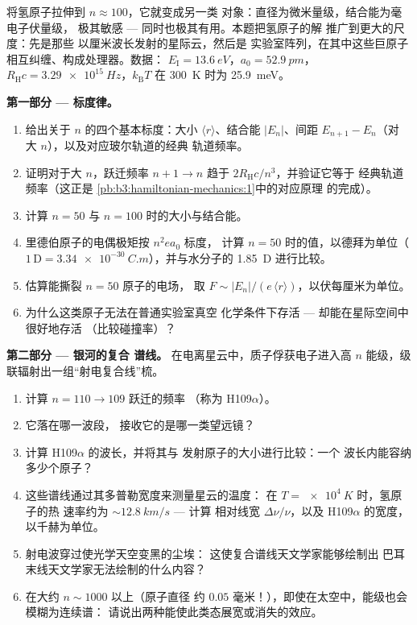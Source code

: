 \begin{problem}\label{pb:b3:hydrogen-atom:1}
将氢原子拉伸到 $n \approx 100$，它就变成另一类
对象：直径为微米量级，结合能为毫电子伏量级，
极其敏感 --- 同时也极其有用。本题把氢原子的解
推广到更大的尺度：先是那些
以厘米波长发射的星际云，然后是
实验室阵列，在其中这些巨原子相互纠缠、构成处理器。数据：
$E_{\text{I}} = \qty{13.6}{eV}$，$a_0 = \qty{52.9}{pm}$，
$R_{\text{H}}c = \qty{3.29e15}{Hz}$，$k_{\text{B}}T$ 在
\qty{300}{K} 时为 \qty{25.9}{meV}。

\medskip\noindent\textbf{第一部分 --- 标度律。}
\begin{enumerate}
  \item 给出关于 $n$ 的四个基本标度：大小 $\langle
        r\rangle$、结合能 $|E_n|$、间距 $E_{n+1} - E_n$（对
        大 $n$），以及对应玻尔轨道的经典
        轨道频率。
  \item 证明对于大 $n$，跃迁频率 $n+1 \to
        n$ 趋于 $2R_{\text{H}}c/n^3$，并验证它等于
        经典轨道频率（这正是
        \cref{pb:b3:hamiltonian-mechanics:1}中的对应原理
        的完成）。
  \item 计算 $n = 50$ 与 $n = 100$ 时的大小与结合能。
  \item 里德伯原子的电偶极矩按 $n^2ea_0$ 标度，
        计算 $n = 50$ 时的值，以德拜为单位（$1\,\text{D} =
        \qty{3.34e-30}{C.m}$），并与水分子的
        \qty{1.85}{D} 进行比较。
  \item 估算能撕裂 $n = 50$ 原子的电场，
        取 $F \sim |E_n|/(e\,\langle r\rangle)$，以伏每厘米为单位。
  \item 为什么这类原子无法在普通实验室真空
        化学条件下存活 --- 却能在星际空间中很好地存活
        （比较碰撞率）？
\end{enumerate}

\medskip\noindent\textbf{第二部分 --- 银河的复合
谱线。}
在电离星云中，质子俘获电子进入高 $n$
能级，级联辐射出一组“射电复合线”梳。
\begin{enumerate}[resume]
  \item 计算 $n = 110 \to 109$ 跃迁的频率
        （称为 H109$\alpha$）。
  \item 它落在哪一波段，
        接收它的是哪一类望远镜？
  \item 计算 H109$\alpha$ 的波长，并将其与
        发射原子的大小进行比较：一个
        波长内能容纳多少个原子？
  \item 这些谱线通过其多普勒宽度来测量星云的温度：
        在 $T = \qty{e4}{K}$ 时，氢原子的热
        速率约为 $\sim\qty{12.8}{km/s}$ --- 计算
        相对线宽 $\Delta\nu/\nu$，以及 H109$\alpha$ 的宽度，
        以千赫为单位。
  \item 射电波穿过使光学天空变黑的尘埃：
        这使复合谱线天文学家能够绘制出
        巴耳末线天文学家无法绘制的什么内容？
  \item 在大约 $n \sim 1000$ 以上（原子直径
        约 $0.05$ 毫米！），即使在太空中，能级也会模糊为连续谱：
        请说出两种能使此类态展宽或消失的效应。
\end{enumerate}


\end{problem}

